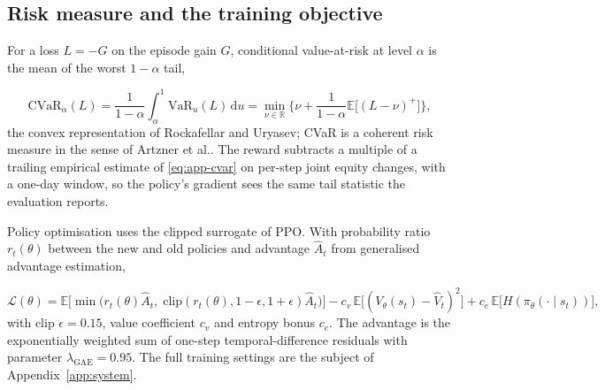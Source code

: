 \subsection{Risk measure and the training objective}

For a loss $L=-G$ on the episode gain $G$, conditional value-at-risk at level
$\alpha$ is the mean of the worst $1-\alpha$ tail,

\begin{equation}
\mathrm{CVaR}_\alpha(L) = \frac{1}{1-\alpha}\int_\alpha^1
\mathrm{VaR}_u(L)\,\mathrm{d}u
= \min_{\nu\in\mathbb{R}}\Big\{\nu+\frac{1}{1-\alpha}\mathbb{E}\big[(L-\nu)^+\big]\Big\},
\label{eq:app-cvar}
\end{equation}
the convex representation of Rockafellar and Uryasev\cite{rockafellar2000cvar};
CVaR is a coherent risk measure in the sense of
Artzner et al.\cite{artzner1999coherent}. The reward subtracts a multiple of a
trailing empirical estimate of \eqref{eq:app-cvar} on per-step joint equity
changes, with a one-day window, so the policy's gradient sees the same tail
statistic the evaluation reports.

Policy optimisation uses the clipped surrogate of PPO\cite{schulman2017ppo}.
With probability ratio $r_t(\theta)$ between the new and old policies and
advantage $\hat A_t$ from generalised advantage estimation\cite{schulman2015gae},

\begin{equation}
\mathcal{L}(\theta) = \mathbb{E}\Big[
\min\big(r_t(\theta)\hat A_t,\;
\mathrm{clip}(r_t(\theta),1-\epsilon,1+\epsilon)\hat A_t\big)\Big]
- c_v\,\mathbb{E}\big[(V_\theta(s_t)-\hat V_t)^2\big]
+ c_e\,\mathbb{E}\big[H(\pi_\theta(\cdot\mid s_t))\big],
\label{eq:app-ppo}
\end{equation}
with clip $\epsilon=0.15$, value coefficient $c_v$ and entropy bonus $c_e$.
The advantage is the exponentially weighted sum of one-step temporal-difference
residuals with parameter $\lambda_{\mathrm{GAE}}=0.95$. The full training
settings are the subject of Appendix~\ref{app:system}.
